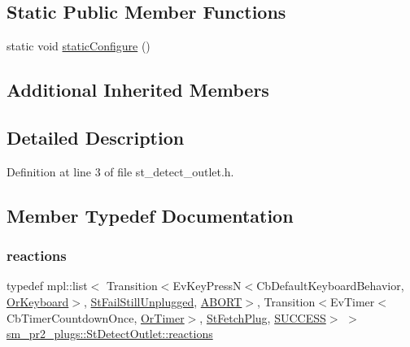 \subsection*{Static Public Member Functions}
\begin{DoxyCompactItemize}
\item 
static void \hyperlink{structsm__pr2__plugs_1_1StDetectOutlet_afec8c7c7af071a426208a1a23f26a2bb}{static\+Configure} ()
\end{DoxyCompactItemize}
\subsection*{Additional Inherited Members}


\subsection{Detailed Description}


Definition at line 3 of file st\+\_\+detect\+\_\+outlet.\+h.



\subsection{Member Typedef Documentation}
\mbox{\label{structsm__pr2__plugs_1_1StDetectOutlet_a5d2a06136d75847c4f23be956d5c157a}} 
\subsubsection{\texorpdfstring{reactions}{reactions}}
{\footnotesize\ttfamily typedef mpl\+::list$<$ Transition$<$Ev\+Key\+PressN$<$Cb\+Default\+Keyboard\+Behavior, \hyperlink{classsm__pr2__plugs_1_1OrKeyboard}{Or\+Keyboard}$>$, \hyperlink{structsm__pr2__plugs_1_1StFailStillUnplugged}{St\+Fail\+Still\+Unplugged}, \hyperlink{classABORT}{A\+B\+O\+RT}$>$, Transition$<$Ev\+Timer$<$Cb\+Timer\+Countdown\+Once, \hyperlink{classsm__pr2__plugs_1_1OrTimer}{Or\+Timer}$>$, \hyperlink{structsm__pr2__plugs_1_1StFetchPlug}{St\+Fetch\+Plug}, \hyperlink{classSUCCESS}{S\+U\+C\+C\+E\+SS}$>$ $>$ \hyperlink{structsm__pr2__plugs_1_1StDetectOutlet_a5d2a06136d75847c4f23be956d5c157a}{sm\+\_\+pr2\+\_\+plugs\+::\+St\+Detect\+Outlet\+::reactions}}




